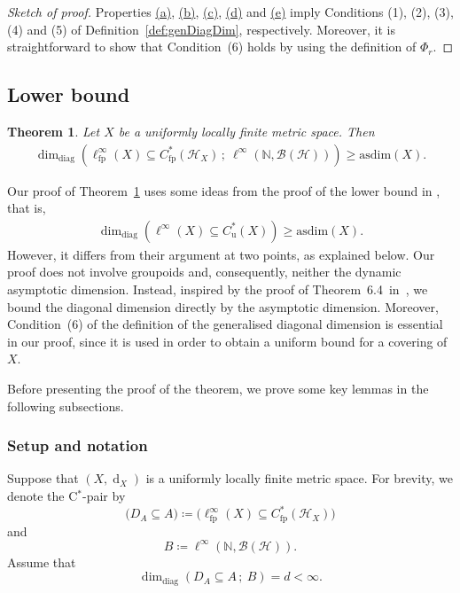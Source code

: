 \documentclass[a4paper]{amsart}
\newcommand{\myhyp}{\textnormal{-}\hskip0pt\relax}
\numberwithin{equation}{section}
\newcommand{\N}{\mathbb{N}}
\newcommand{\Bcal}{\mathcal{B}}
\newcommand{\Hcal}{\mathcal{H}}
\newcommand{\cstarPair}{C$^\ast$\myhyp{}pair}
\newcommand{\bop}[1]{\Bcal({#1})}
\newcommand{\Cu}[1]{C^{\ast}_{\mathrm{u}}({#1})}
\newcommand{\Cfp}[1]{C^{\ast}_{\mathrm{fp}}({#1})}
\newcommand{\CfpCartan}[1]{\ell^{\infty}_{\mathrm{fp}}({#1})}
\newcommand{\prn}[1]{{(#1)}}
\DeclareMathOperator{\dist}{d}
\newcommand{\ddim}[2]{\dim_{\mathrm{diag}}({#1}\subseteq{#2})}
\newcommand{\ddimn}[3]{\dim_{\mathrm{diag}}({#1}\subseteq{#2}\, ;~{#3})}
\newcommand{\asdim}[1]{\mathrm{asdim}({#1})}
\theoremstyle{plain}
\newtheorem{thm}{Theorem}[section]
\theoremstyle{indented}
\numberwithin{equation}{section}
\theoremstyle{definition}
\theoremstyle{remark}
\theoremstyle{plain}
\theoremstyle{definition}
\begin{document}
\begin{proof}[Sketch of proof]
    Properties \hyperref[eq:upperBoundCPAlgPropa]{(a)},
    \hyperref[eq:upperBoundCPAlgPropb]{(b)},
    \hyperref[eq:upperBoundCPAlgPropc]{(c)},
    \hyperref[eq:upperBoundCPAlgPropd]{(d)}
    and \hyperref[eq:upperBoundCPAlgPrope]{(e)} imply
    Conditions (1), (2), (3), (4) and (5) of Definition~\ref{def:genDiagDim},
    respectively.
    Moreover, it is straightforward to show that Condition~(6) holds by using the definition of ${\Phi_r}$. \qedhere
\end{proof}


\medskip
\subsection{Lower bound}

\begin{thm}  \label{thm:lowerBoundFPAlg}
    Let $X$ be a uniformly locally finite metric space.
    Then
    \begin{align*}
         \ddimn{\CfpCartan{X}}{\Cfp{\Hcal_X}}{\ell^\infty(\N, \bop{\Hcal})} \ge \asdim{X}.
    \end{align*}
\end{thm}

Our proof of Theorem~\ref{thm:lowerBoundFPAlg} uses some ideas from the proof of the
lower bound in \cite[Theorem~7.7]{LiLiaoWinter2023diagDim}, that is,
\begin{align*}
         \ddim{\ell^\infty\prn{X}}{\Cu{X}} \ge \asdim{X}.
\end{align*}
However, it differs from their argument at two points, as explained below.
Our proof does not involve groupoids and, consequently, neither the dynamic asymptotic dimension.
Instead, inspired by the proof of Theorem~6.4~in~\cite{GuentnerWillettYu2017dynAsDim}, 
we bound the diagonal dimension
directly by the asymptotic dimension. 
Moreover, Condition~(6) of the definition of the generalised diagonal dimension is essential in our proof, since it is used in order to obtain 
a uniform bound for a covering of $X$.

Before presenting the proof of the theorem, 
we prove some key lemmas in the following subsections.

\subsubsection{Setup and notation}
Suppose that $(X, \dist_X)$ is a uniformly locally finite metric space. 
For brevity, we denote the \cstarPair{} by 
    \[\big( D_A \subseteq A \big) \coloneq \big(\CfpCartan{X} \subseteq \Cfp{\Hcal_X} \big)\]
and 
\[B \coloneq \ell^\infty(\N, \bop{\Hcal}).\]
Assume that 
\[\ddimn{D_A}{A}{B}  = d < \infty.\]
\end{document}
